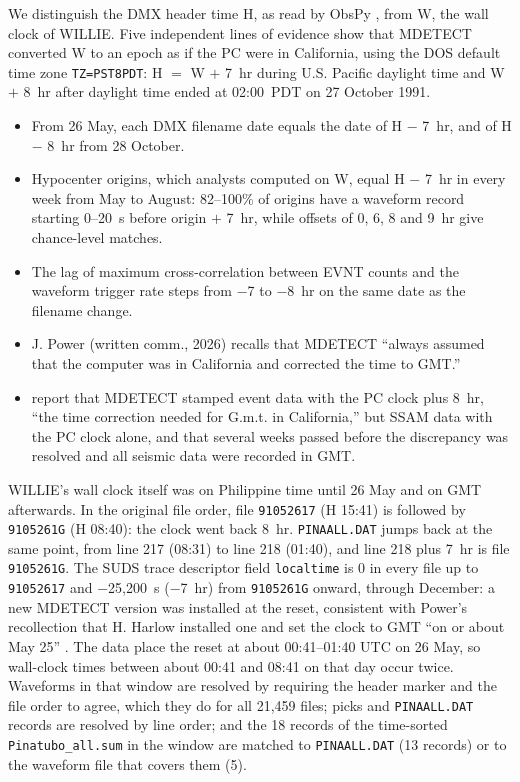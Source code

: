 \documentclass[linenum]{SSA-SRL}
\newcommand{\file}[1]{\texttt{#1}}
\begin{document}
We distinguish the DMX header time H, as read by ObsPy \citep{Beyreuther_2010,Krischer_2015}, from W, the wall clock of WILLIE. Five independent lines of evidence show that MDETECT converted W to an epoch as if the PC were in California, using the DOS default time zone \texttt{TZ=PST8PDT}: H $=$ W $+$ 7~hr during U.S. Pacific daylight time and W $+$ 8~hr after daylight time ended at 02:00~PDT on 27 October 1991.
\begin{itemize}
\item From 26 May, each DMX filename date equals the date of H $-$ 7~hr, and of H $-$ 8~hr from 28 October.
\item Hypocenter origins, which analysts computed on W, equal H $-$ 7~hr in every week from May to August: 82--100\% of origins have a waveform record starting 0--20~s before origin $+$ 7~hr, while offsets of 0, 6, 8 and 9~hr give chance-level matches.
\item The lag of maximum cross-correlation between EVNT counts and the waveform trigger rate steps from $-$7 to $-$8~hr on the same date as the filename change.
\item J. Power (written comm., 2026) recalls that MDETECT ``always assumed that the computer was in California and corrected the time to GMT.''
\item \citet{Murray_1996} report that MDETECT stamped event data with the PC clock plus 8~hr, ``the time correction needed for G.m.t. in California,'' but SSAM data with the PC clock alone, and that several weeks passed before the discrepancy was resolved and all seismic data were recorded in GMT.
\end{itemize}

WILLIE's wall clock itself was on Philippine time until 26 May and on GMT afterwards. In the original file order, file \file{91052617} (H 15:41) is followed by \file{9105261G} (H 08:40): the clock went back 8~hr. \file{PINAALL.DAT} jumps back at the same point, from line 217 (08:31) to line 218 (01:40), and line 218 plus 7~hr is file \file{9105261G}. The SUDS trace descriptor field \texttt{localtime} is 0 in every file up to \file{91052617} and $-$25,200~s ($-$7~hr) from \file{9105261G} onward, through December: a new MDETECT version was installed at the reset, consistent with Power's recollection that H. Harlow installed one and set the clock to GMT ``on or about May 25'' \citep[see also][]{Murray_1996}. The data place the reset at about 00:41--01:40 UTC on 26 May, so wall-clock times between about 00:41 and 08:41 on that day occur twice. Waveforms in that window are resolved by requiring the header marker and the file order to agree, which they do for all 21,459 files; picks and \file{PINAALL.DAT} records are resolved by line order; and the 18 records of the time-sorted \file{Pinatubo\_all.sum} in the window are matched to \file{PINAALL.DAT} (13 records) or to the waveform file that covers them (5).
\end{document}
